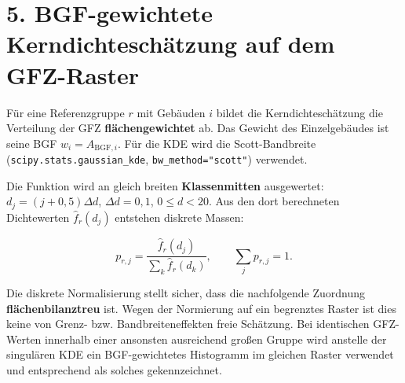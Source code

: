 \documentclass[
  ngerman,
  a4paper,
  DIV=11]{scrreprt}
\begin{document}
\section{5. BGF-gewichtete Kerndichteschätzung auf dem
GFZ-Raster}\label{bgf-gewichtete-kerndichteschuxe4tzung-auf-dem-gfz-raster}

Für eine Referenzgruppe \(r\) mit Gebäuden \(i\) bildet die
Kerndichteschätzung die Verteilung der GFZ \textbf{flächengewichtet} ab.
Das Gewicht des Einzelgebäudes ist seine BGF \(w_i=A_{\mathrm{BGF},i}\).
Für die KDE wird die Scott-Bandbreite
(\texttt{scipy.stats.gaussian\_kde}, \texttt{bw\_method="scott"})
verwendet.

Die Funktion wird an gleich breiten \textbf{Klassenmitten} ausgewertet:
\(d_j=(j+0{,}5)\Delta d\), \(\Delta d=0{,}1\), \(0\le d<20\). Aus den
dort berechneten Dichtewerten \(\hat f_r(d_j)\) entstehen diskrete
Massen:

\[p_{r,j}=\frac{\hat f_r(d_j)}{\sum_k\hat f_r(d_k)},\qquad\sum_j p_{r,j}=1.\]

Die diskrete Normalisierung stellt sicher, dass die nachfolgende
Zuordnung \textbf{flächenbilanztreu} ist. Wegen der Normierung auf ein
begrenztes Raster ist dies keine von Grenz- bzw. Bandbreiteneffekten
freie Schätzung. Bei identischen GFZ-Werten innerhalb einer ansonsten
ausreichend großen Gruppe wird anstelle der singulären KDE ein
BGF-gewichtetes Histogramm im gleichen Raster verwendet und entsprechend
als solches gekennzeichnet.
\end{document}
